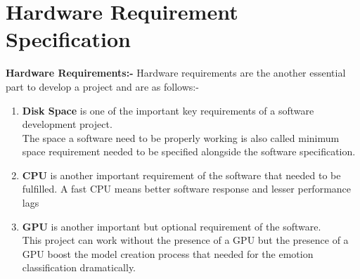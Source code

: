 \section{Hardware Requirement Specification}
\textbf{Hardware Requirements:-}  Hardware requirements are the another essential part to develop a project and are as follows:-
\begin{enumerate}
	\item \textbf{Disk Space} is one of the important key requirements of a software development project.\\The space a software need to be properly working is also called minimum space requirement needed to be specified alongside the software specification.
	\item \textbf{CPU} is another important requirement of the software that needed to be fulfilled. A fast CPU means better software response and lesser performance lags
	\item\textbf{GPU} is another important but optional requirement of the software.\\This project can work without the presence of a GPU but the presence of a GPU boost the model creation process that needed for the emotion classification dramatically.
\end{enumerate}